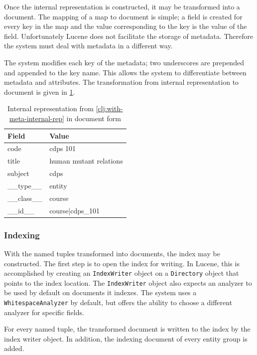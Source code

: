 			Once the internal representation is constructed, it may be transformed into a document.  The mapping of a map to document is simple; a field is created for every key in the map and the value corresponding to the key is the value of the field.  Unfortunately Lucene does not facilitate the storage of metadata.  Therefore the system must deal with metadata in a different way.
			
			The system modifies each key of the metadata; two underscores are prepended and appended to the key name.  This allows the system to differentiate between metadata and attributes.  The transformation from internal representation to document is given in \cref{tbl:internal-rep-to-document}.
			
			\begin{table}
				\centering
				
				\begin{tabular}{ll}
					\toprule
					Field & Value \\
					\midrule
					code & cdps 101 \\
					title & human mutant relations \\
					subject & cdps \\
					\_\_type\_\_ & entity \\
					\_\_class\_\_ & course \\
					\_\_id\_\_ & course|cdps\_101 \\
					\bottomrule
				\end{tabular}
				
				\caption{Internal representation from \cref{clj:with-meta-internal-rep} in document form}
				\label{tbl:internal-rep-to-document}
			\end{table}
		
		\subsubsection{Indexing}
			With the named tuples transformed into documents, the index may be constructed.  The first step is to open the index for writing.  In Lucene, this is accomplished by creating an \texttt{IndexWriter} object on a \texttt{Directory} object that points to the index location.  The \texttt{IndexWriter} object also expects an analyzer to be used by default on documents it indexes.  The system uses a \texttt{WhitespaceAnalyzer} by default, but offers the ability to choose a different analyzer for specific fields.
			
			For every named tuple, the transformed document is written to the index by the index writer object.  In addition, the indexing document of every entity group is added.
		

